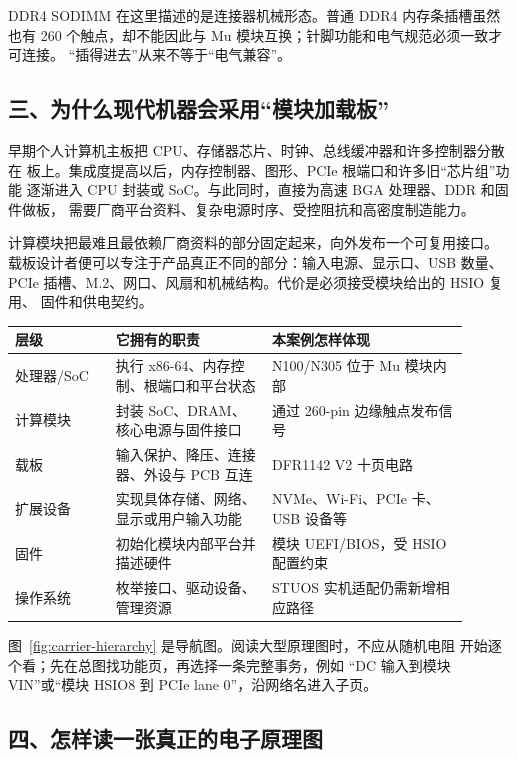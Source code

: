 DDR4 SODIMM 在这里描述的是连接器机械形态。普通 DDR4 内存条插槽虽然也有
260 个触点，却不能因此与 Mu 模块互换；针脚功能和电气规范必须一致才可连接。
“插得进去”从来不等于“电气兼容”。

\subsection{三、为什么现代机器会采用“模块加载板”}

早期个人计算机主板把 CPU、存储器芯片、时钟、总线缓冲器和许多控制器分散在
板上。集成度提高以后，内存控制器、图形、PCIe 根端口和许多旧“芯片组”功能
逐渐进入 CPU 封装或 SoC。与此同时，直接为高速 BGA 处理器、DDR 和固件做板，
需要厂商平台资料、复杂电源时序、受控阻抗和高密度制造能力。

计算模块把最难且最依赖厂商资料的部分固定起来，向外发布一个可复用接口。
载板设计者便可以专注于产品真正不同的部分：输入电源、显示口、USB 数量、
PCIe 插槽、M.2、网口、风扇和机械结构。代价是必须接受模块给出的 HSIO 复用、
固件和供电契约。

\begin{longtable}{L{0.20\linewidth}L{0.31\linewidth}L{0.39\linewidth}}
\toprule
层级 & 它拥有的职责 & 本案例怎样体现 \\
\midrule
处理器/SoC & 执行 x86-64、内存控制、根端口和平台状态 & N100/N305 位于 Mu 模块内部 \\
计算模块 & 封装 SoC、DRAM、核心电源与固件接口 & 通过 260-pin 边缘触点发布信号 \\
载板 & 输入保护、降压、连接器、外设与 PCB 互连 & DFR1142 V2 十页电路 \\
扩展设备 & 实现具体存储、网络、显示或用户输入功能 & NVMe、Wi-Fi、PCIe 卡、USB 设备等 \\
固件 & 初始化模块内部平台并描述硬件 & 模块 UEFI/BIOS，受 HSIO 配置约束 \\
操作系统 & 枚举接口、驱动设备、管理资源 & STUOS 实机适配仍需新增相应路径 \\
\bottomrule
\end{longtable}


图~\ref{fig:carrier-hierarchy} 是导航图。阅读大型原理图时，不应从随机电阻
开始逐个看；先在总图找功能页，再选择一条完整事务，例如
“DC 输入到模块 VIN”或“模块 HSIO8 到 PCIe lane 0”，沿网络名进入子页。

\subsection{四、怎样读一张真正的电子原理图}

